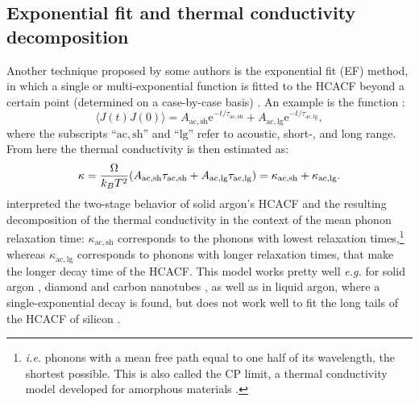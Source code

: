 \begin{LEtext}
\subsection{Exponential fit and thermal conductivity decomposition}  \label{sec:exp-fit-decomposition}
Another technique proposed by some authors is the exponential fit (EF) method, in which a single or multi-exponential function is fitted to the HCACF beyond a certain point (determined on a case-by-case basis) \cite{Che2000a,Li1998,Zhang2015}. An example is the function \cite{Che2000a}:
\begin{equation}
    \langle J(t) J(0) \rangle = A_{\mathrm{ac,sh}} \mathrm{e}^{-t/\tau_{\mathrm{ac,sh}}} + A_{\mathrm{ac,lg}} \mathrm{e}^{-t/\tau_{\mathrm{ac,lg}}},
\end{equation}
where the subscripts ``$\mathrm{ac,sh}$'' and ``$\mathrm{lg}$'' refer to acoustic, short-, and long range. From here the thermal conductivity is then estimated as:
\begin{equation}
    \kappa = \frac{\rOmega}{k_B T^2} (A_{\mathrm{ac,sh}}\tau_{\mathrm{ac,sh}} + A_{\mathrm{ac,lg}}\tau_{\mathrm{ac,lg}})  =  \kappa_{\mathrm{ac,sh}} + \kappa_{\mathrm{ac,lg}}. \label{eq:kappa-2exp-fit}
\end{equation}
\citet{McGaughey2004a} interpreted the two-stage behavior of solid argon's HCACF and the resulting decomposition of the thermal conductivity in the context of the mean phonon relaxation time: $\kappa_{\mathrm{ac,sh}}$ corresponds to the phonons with lowest relaxation times,\footnote{\emph{i.e.} phonons with a mean free path equal to one half of its wavelength, the shortest possible. This is also called the CP limit, a thermal conductivity model developed for amorphous materials \cite{Cahill1989,Cahill1992}.} whereas $\kappa_{\mathrm{ac,lg}}$ corresponds to phonons with longer relaxation times, that make the longer decay time of the HCACF.
This model works pretty well \emph{e.g.} for solid argon \cite{McGaughey2004a}, diamond and carbon nanotubes \cite{Che2000a,Che2000b}, as well as in liquid argon, where a single-exponential decay is found, but does not work well to fit the long tails of the HCACF of silicon \cite{Schelling2002}.


\end{LEtext}
